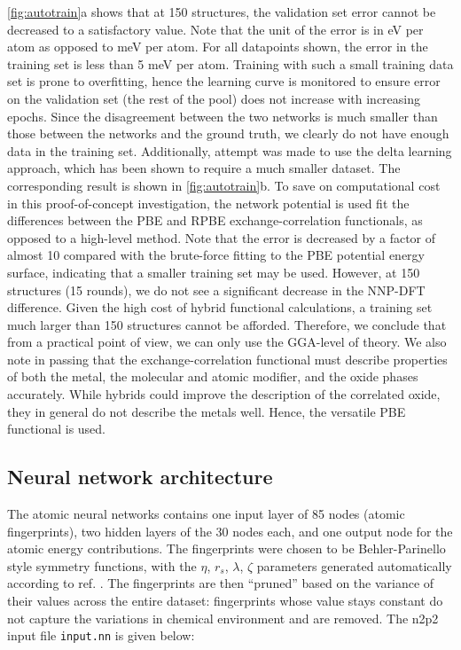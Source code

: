 \documentclass[manuscript=cmatex]{achemso}
\begin{document}
\cref{fig:autotrain}a shows that at 150 structures, the validation set error cannot be decreased to a satisfactory value. Note that the unit of the error is in eV per atom as opposed to meV per atom. For all datapoints shown, the error in the training set is less than 5 meV per atom. Training with such a small training data set is prone to overfitting, hence the learning curve is monitored to ensure error on the validation set (the rest of the pool) does not increase with increasing epochs. Since the disagreement between the two networks is much smaller than those between the networks and the ground truth, we clearly do not have enough data in the training set.
Additionally, attempt was made to use the delta learning approach, which has been shown to require a much smaller dataset. The corresponding result is shown in \cref{fig:autotrain}b. To save on computational cost in this proof-of-concept investigation, the network potential is used fit the differences between the PBE and RPBE exchange-correlation functionals, as opposed to a high-level method. Note that the error is decreased by a factor of almost 10 compared with the brute-force fitting to the PBE potential energy surface, indicating that a smaller training set may be used. However, at 150 structures (15 rounds), we do not see a significant decrease in the NNP-DFT difference.
Given the high cost of hybrid functional calculations, a training set much larger than 150 structures cannot be afforded. Therefore, we conclude that from a practical point of view, we can only use the GGA-level of theory. We also note in passing that the exchange-correlation functional must describe properties of both the metal, the molecular and atomic modifier, and the oxide phases accurately. While hybrids could improve the description of the correlated oxide, they in general do not describe the metals well. Hence, the versatile PBE functional is used.
\subsection{Neural network architecture}
The atomic neural networks contains one input layer of 85 nodes (atomic fingerprints), two hidden layers of the 30 nodes each, and one output node for the atomic energy contributions. The fingerprints were chosen to be Behler-Parinello style symmetry functions, with the $\eta$, $r_{s}$, $\lambda$, $\zeta$ parameters generated automatically according to ref. \cite{imbalzano_automatic_2018}. The fingerprints are then ``pruned'' based on the variance of their values across the entire dataset: fingerprints whose value stays constant do not capture the variations in chemical environment and are removed. The n2p2 input file \texttt{input.nn} is given below:

\end{document}
